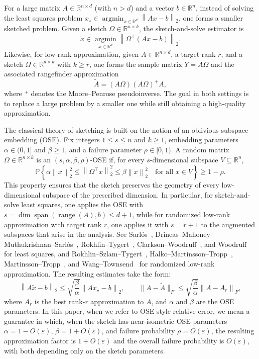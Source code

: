 \documentclass[onefignum,onetabnum]{siamart251216}
\newcommand{\R}{\mathbb{R}}
\newcommand{\Prob}{\mathbb{P}}
\newcommand{\norm}[1]{\left\lVert #1 \right\rVert}
\newcommand{\range}{\operatorname{range}}
\newcommand{\argmin}{\operatorname*{argmin}}
\newcommand{\eps}{\varepsilon}
\begin{document}
For a large matrix $A\in\R^{n\times d}$ (with $n>d$) and a vector $b\in\R^n$,  instead of solving the least squares problem $x_\star \in \argmin_{x\in\R^d} \norm{Ax - b}_2$,  one forms a smaller sketched problem. Given a sketch $\Omega\in\R^{n\times k}$, the sketch-and-solve estimator is
\[
\widetilde{x}\in \argmin_{x\in\R^d} \norm{\Omega^\top (Ax-b)}_2.
\]
Likewise, for low-rank approximation, given $A\in\R^{n\times d}$, a target rank $r$, and a sketch $\Omega\in\R^{d\times k}$ with $k\ge r$, one forms the sample matrix $Y=A\Omega$ and the associated rangefinder approximation
\[
\widetilde A = (A\Omega)(A\Omega)^+A,
\]
where ${}^+$ denotes the Moore--Penrose pseudoinverse. The goal in both settings is to replace a large problem by a smaller one while still obtaining a high-quality approximation.

The classical theory of sketching is built on the notion of an oblivious subspace embedding (OSE). Fix integers $1 \le s \le n$ and $k\ge 1$, embedding parameters $\alpha \in (0,1]$ and $\beta\geq 1$, and a failure parameter $\rho \in [0,1)$. A random matrix $\Omega \in \R^{n \times k}$ is an $(s,\alpha,\beta,\rho)$-OSE if, for every $s$-dimensional subspace $V \subseteq \R^n$,
\[
\Prob\!\left\{
\alpha \norm{x}_2^2 \le \norm{\Omega^\top x}_2^2 \le \beta \norm{x}_2^2
\quad \text{for all } x \in V
\right\}
\ge 1-\rho.
\]
This property ensures that the sketch preserves the geometry of every low-dimensional subspace of the prescribed dimension. In particular, for sketch-and-solve least squares, one applies the OSE with $s=\dim\operatorname{span}(\range(A),b)\le d+1$, while for randomized low-rank approximation with target rank $r$, one applies it with $s=r+1$ to the augmented subspaces that arise in the analysis. See Sarl\'os~\cite{Sarlos2006}, Drineas--Mahoney--Muthukrishnan--Sarl\'os~\cite{DrineasMahoneyMuthukrishnanSarlos2011}, Rokhlin--Tygert~\cite{RokhlinTygert2008}, Clarkson--Woodruff~\cite{ClarksonWoodruff2013}, and Woodruff~\cite{Woodruff2014} for least squares, and Rokhlin--Szlam--Tygert~\cite{RokhlinSzlamTygert2009}, Halko--Martinsson--Tropp~\cite{HalkoMartinssonTropp2011}, Martinsson--Tropp~\cite{MartinssonTropp2020}, and Wang--Townsend~\cite{wang2026beyond} for randomized low-rank approximation. The resulting estimates take the form:
\[
\norm{A\widetilde{x} - b}_2 \leq \sqrt{\frac{\beta}{\alpha}}\norm{Ax_\star - b}_2, \qquad \|A - \widetilde{A}\|_F\leq \sqrt{\frac{\beta}{\alpha}}\norm{A - A_r}_F,
\]
where $A_r$ is the best rank-$r$ approximation to $A$, and $\alpha$ and $\beta$ are the OSE parameters.  In this paper, when we refer to OSE-style relative error, we mean a guarantee in which, when the sketch has near-isometric OSE parameters $\alpha = 1 - O(\eps)$, $\beta = 1 + O(\eps)$, and failure probability $\rho = O(\eps)$, the resulting approximation factor is $1 + O(\eps)$ and the overall failure probability is $O(\eps)$, with both depending only on the sketch parameters.
\end{document}
